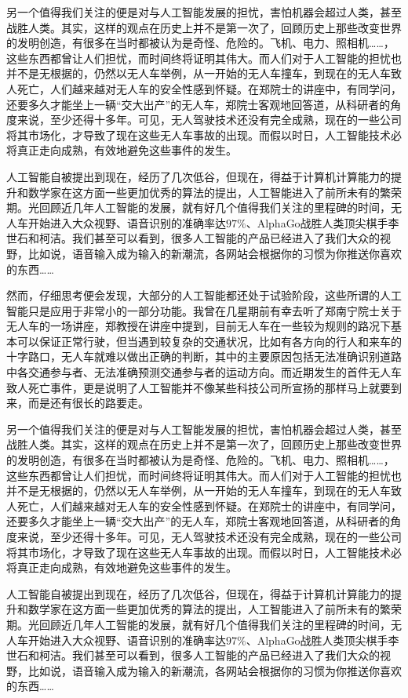 \documentclass[UTF8]{XJTUthesis}
\begin{document}
另一个值得我们关注的便是对与人工智能发展的担忧，害怕机器会超过人类，甚至战胜人类。其实，这样的观点在历史上并不是第一次了，回顾历史上那些改变世界的发明创造，有很多在当时都被认为是奇怪、危险的。飞机、电力、照相机……，这些东西都曾让人们担忧，而时间终将证明其伟大。而人们对于人工智能的担忧也并不是无根据的，仍然以无人车举例，从一开始的无人车撞车，到现在的无人车致人死亡，人们越来越对无人车的安全性感到怀疑。在郑院士的讲座中，有同学问，还要多久才能坐上一辆“交大出产”的无人车，郑院士客观地回答道，从科研者的角度来说，至少还得十多年。可见，无人驾驶技术还没有完全成熟，现在的一些公司将其市场化，才导致了现在这些无人车事故的出现。而假以时日，人工智能技术必将真正走向成熟，有效地避免这些事件的发生。\par
人工智能自被提出到现在，经历了几次低谷，但现在，得益于计算机计算能力的提升和数学家在这方面一些更加优秀的算法的提出，人工智能进入了前所未有的繁荣期。光回顾近几年人工智能的发展，就有好几个值得我们关注的里程碑的时间，无人车开始进入大众视野、语音识别的准确率达$97\%$、AlphaGo战胜人类顶尖棋手李世石和柯洁。我们甚至可以看到，很多人工智能的产品已经进入了我们大众的视野，比如说，语音输入成为输入的新潮流，各网站会根据你的习惯为你推送你喜欢的东西……\par
然而，仔细思考便会发现，大部分的人工智能都还处于试验阶段，这些所谓的人工智能只是应用于非常小的一部分功能。我曾在几星期前有幸去听了郑南宁院士关于无人车的一场讲座，郑教授在讲座中提到，目前无人车在一些较为规则的路况下基本可以保证正常行驶，但当遇到较复杂的交通状况，比如有各方向的行人和来车的十字路口，无人车就难以做出正确的判断，其中的主要原因包括无法准确识别道路中各交通参与者、无法准确预测交通参与者的运动方向。而近期发生的首件无人车致人死亡事件，更是说明了人工智能并不像某些科技公司所宣扬的那样马上就要到来，而是还有很长的路要走。\par
另一个值得我们关注的便是对与人工智能发展的担忧，害怕机器会超过人类，甚至战胜人类。其实，这样的观点在历史上并不是第一次了，回顾历史上那些改变世界的发明创造，有很多在当时都被认为是奇怪、危险的。飞机、电力、照相机……，这些东西都曾让人们担忧，而时间终将证明其伟大。而人们对于人工智能的担忧也并不是无根据的，仍然以无人车举例，从一开始的无人车撞车，到现在的无人车致人死亡，人们越来越对无人车的安全性感到怀疑。在郑院士的讲座中，有同学问，还要多久才能坐上一辆“交大出产”的无人车，郑院士客观地回答道，从科研者的角度来说，至少还得十多年。可见，无人驾驶技术还没有完全成熟，现在的一些公司将其市场化，才导致了现在这些无人车事故的出现。而假以时日，人工智能技术必将真正走向成熟，有效地避免这些事件的发生。\par
人工智能自被提出到现在，经历了几次低谷，但现在，得益于计算机计算能力的提升和数学家在这方面一些更加优秀的算法的提出，人工智能进入了前所未有的繁荣期。光回顾近几年人工智能的发展，就有好几个值得我们关注的里程碑的时间，无人车开始进入大众视野、语音识别的准确率达$97\%$、AlphaGo战胜人类顶尖棋手李世石和柯洁。我们甚至可以看到，很多人工智能的产品已经进入了我们大众的视野，比如说，语音输入成为输入的新潮流，各网站会根据你的习惯为你推送你喜欢的东西……\par
\end{document}
